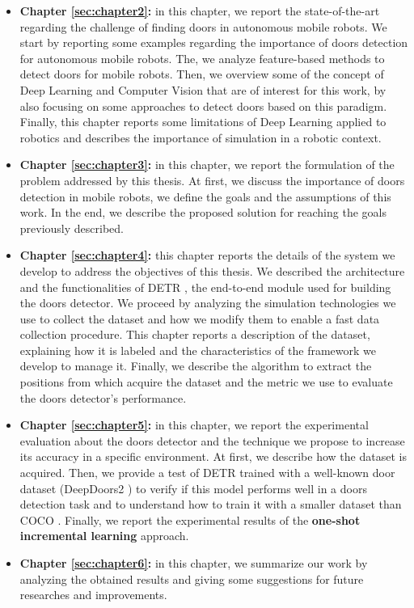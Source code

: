 \begin{itemize}
	\item \textbf{Chapter \ref{sec:chapter2}:} in this chapter, we report the state-of-the-art regarding the challenge of finding doors in autonomous mobile robots. We start by reporting some examples regarding the importance of doors detection for autonomous mobile robots. The, we analyze feature-based methods to detect doors for mobile robots. Then, we overview some of the concept of Deep Learning and Computer Vision that are of interest for this work, by also focusing on some approaches to detect doors based on this paradigm. Finally, this chapter reports some limitations of Deep Learning applied to robotics and describes the importance of simulation in a robotic context.
	
	\item \textbf{Chapter \ref{sec:chapter3}:} in this chapter, we report the formulation of the problem addressed by this thesis. At first, we discuss the importance of doors detection in mobile robots, we define the goals and the assumptions of this work. In the end, we describe the proposed solution for reaching the goals previously described.
	
	\item \textbf{Chapter \ref{sec:chapter4}:} this chapter reports the details of the system we develop to address the objectives of this thesis. We described the architecture and the functionalities of DETR \cite{detr}, the end-to-end module used for building the doors detector. We proceed by analyzing the simulation technologies we use to collect the dataset and how we modify them to enable a fast data collection procedure. This chapter reports a description of the dataset, explaining how it is labeled and the characteristics of the framework we develop to manage it. Finally, we describe the algorithm to extract the positions from which acquire the dataset and the metric we use to evaluate the doors detector's performance.
	
	\item \textbf{Chapter \ref{sec:chapter5}:} in this chapter, we report the experimental evaluation about the doors detector and the technique we propose to increase its accuracy in a specific environment. At first, we describe how  the dataset is acquired. Then, we provide a test of DETR trained with a well-known door dataset (DeepDoors2 \cite{deepdoors2}) to verify if this model performs well in a doors detection task and to understand how to train it with a smaller dataset than COCO \cite{coco}. Finally, we report the experimental results of the \textbf{one-shot incremental learning} approach.
	
	\item \textbf{Chapter \ref{sec:chapter6}:} in this chapter, we summarize our work by analyzing the obtained results and giving some suggestions for future researches and improvements.
\end{itemize}
